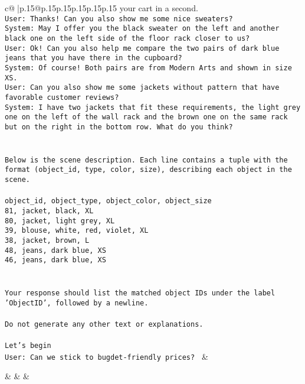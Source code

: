 \documentclass{article}
\begin{document}
{\begin{supertabular}{c@{$\;$}|p{.15\linewidth}@{}p{.15\linewidth}p{.15\linewidth}p{.15\linewidth}p{.15\linewidth}p{.15\linewidth}}
{{{your cart in a second.\\ \tt User: Thanks! Can you also show me some nice sweaters?\\ \tt System: May I offer you the black sweater on the left  and another black one on the left side  of the floor rack closer to us?\\ \tt User: Ok! Can you also help me compare the two pairs of dark blue jeans that you have there in the cupboard?\\ \tt System: Of course! Both pairs are from Modern Arts  and shown in size XS.\\ \tt User: Can you also show me some jackets without pattern that have favorable customer reviews?\\ \tt System: I have two jackets that fit these requirements, the light grey one on the left of the wall rack and the brown one on the same rack but  on the right in the bottom row. What do you think?\\ \tt \\ \tt \\ \tt Below is the scene description. Each line contains a tuple with the format (object_id, type, color, size), describing each object in the scene.\\ \tt \\ \tt object_id, object_type, object_color, object_size\\ \tt 81, jacket, black, XL\\ \tt 80, jacket, light grey, XL\\ \tt 39, blouse, white, red, violet, XL\\ \tt 38, jacket, brown, L\\ \tt 48, jeans, dark blue, XS\\ \tt 46, jeans, dark blue, XS\\ \tt \\ \tt \\ \tt Your response should list the matched object IDs under the label 'ObjectID', followed by a newline.\\ \tt \\ \tt Do not generate any other text or explanations.\\ \tt \\ \tt Let's begin\\ \tt User: Can we stick to bugdet-friendly prices? 
	  } 
	   } 
	   } 
	 & \\ 
 

    \theutterance {}  

    &  
	 & & \\ 
 


\end{supertabular}}
\end{document}
